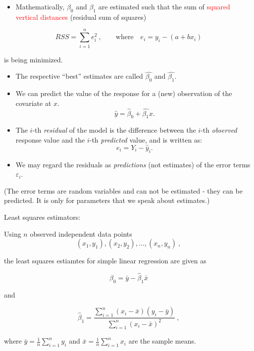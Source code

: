 \documentclass[10pt,ignorenonframetext,]{beamer}
\providecommand{\tightlist}{%
  \setlength{\itemsep}{0pt}\setlength{\parskip}{0pt}}
\begin{document}
\begin{frame}

\begin{itemize}
\tightlist
\item
  Mathematically, \(\beta_0\) and \(\beta_1\) are estimated such that
  the sum of \textcolor{red}{squared vertical distances} (residual sum
  of squares)
\end{itemize}

\[RSS = \sum_{i=1}^n e_i^2 \ , \qquad \text{where} \quad e_i = y_i - (a + b x_i) \]

is being minimized.

\begin{itemize}
\item
  The respective ``best'' estimates are called \(\hat{\beta_0}\) and
  \(\hat{\beta_1}\).
\item
  We can predict the value of the response for a (new) observation of
  the covariate at \(x\). \[\hat{y} = \hat{\beta}_0 + \hat{\beta_1}x.\]
\item
  The \(i\)-th \emph{residual} of the model is the difference between
  the \(i\)-th \emph{observed} response value and the \(i\)-th
  \emph{predicted} value, and is written as: \[e_i = Y_i - \hat{y}_i.\]
\item
  We may regard the residuals as \emph{predictions} (not estimates) of
  the error terms \(\varepsilon_i\).
\end{itemize}

\tiny
(The error terms are random variables and can not be estimated - they
can be predicted. It is only for parameters that we speak about
estimates.)

\end{frame}

\begin{frame}

\begin{block}{Least squares estimators:}

Using \(n\) observed independent data points
\[(x_1,y_1), (x_2,y_2), \ldots, (x_n,y_n)\ ,\]

the least squares estiamtes for simple linear regression are given as

\begin{equation}\label{eq:beta0}
\hat{\beta}_0 = \bar{y}-\hat{\beta}_1 \bar{x}
\end{equation}

and

\begin{equation}\label{eq:beta0}
\hat{\beta}_1 = \frac{\sum_{i=1}^n(x_i-\bar{x})(y_i-\bar{y})}{\sum_{i=1}^n(x_i-\bar{x})^2} \ ,
\end{equation}

where \(\bar{y} = \frac{1}{n} \sum_{i=1}^n y_i\) and
\(\bar{x} = \frac{1}{n}\sum_{i=1}^n x_i\) are the sample means.

\end{block}

\end{frame}
\end{document}
